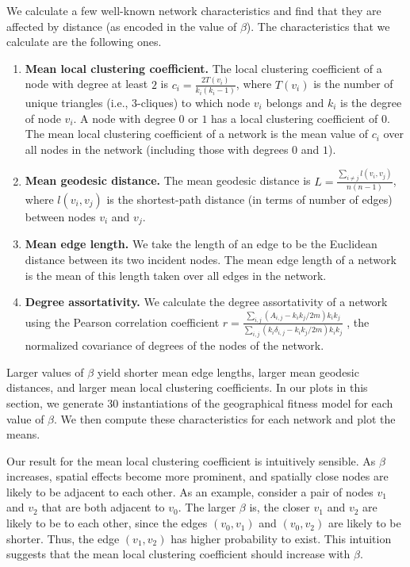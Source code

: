 \documentclass[%
 reprint,
 amsmath,amssymb,
 aps,
]{revtex4-1}
\begin{document}
We calculate a few well-known network characteristics \cite{newman2018} and find that they are affected by distance (as encoded in the value of $\beta$). The characteristics that we calculate are the following ones.
\begin{enumerate}\label{characteristics_definitions}
    \item {\bf Mean local clustering coefficient.} The local clustering coefficient of a node with degree at least $2$ is $c_i = \frac{2T(v_i)}{k_i(k_i - 1)}$, where $T(v_i)$ is the number of unique triangles (i.e., $3$-cliques) to which node $v_i$ belongs and $k_i$ is the degree of node $v_i$. A node with degree $0$ or $1$ has a local clustering coefficient of $0$. The mean local clustering coefficient of a network is the mean value of $c_i$ over all nodes in the network (including those with degrees $0$ and $1$). 
    \item {\bf Mean geodesic distance.} The mean geodesic distance is  $L = \frac{\sum_{i \neq j}l(v_i, v_j)}{n(n-1)}$, where $l(v_i, v_j)$ is the shortest-path distance (in terms of number of edges) between nodes $v_i$ and $v_j$.
    \item {\bf Mean edge length.} We take the length of an edge to be the Euclidean distance between its two incident nodes. The mean edge length of a network is the mean 
    {\color{red}of this length taken} over all edges in the network.
    
    \item {\bf Degree assortativity.} We calculate the degree assortativity of a network using the Pearson correlation coefficient $r = \frac{\sum_{i,j}(A_{i,j}-k_i k_j/2m)k_i k_j}{\sum_{i,j}(k_i \delta_{i,j}-k_i k_j/2m)k_i k_j}$ \cite{newman2018}, the normalized covariance of degrees of the nodes of the network.
\end{enumerate}


Larger values of $\beta$ yield shorter mean edge lengths, larger mean geodesic distances, and larger mean local clustering coefficients. In our plots in this section, {\color{red}we generate 30 instantiations of the geographical fitness model for each value of $\beta$. We then compute these characteristics for each network and plot the means.}

Our result for the mean local clustering coefficient is intuitively sensible. {\color{red}As $\beta$ increases, spatial effects become more prominent, and spatially close nodes are likely to be adjacent to each other. As an example, consider a pair of nodes $v_1$ and $v_2$ that are both adjacent to $v_0$. The larger $\beta$ is, the closer $v_1$ and $v_2$ are likely to be to each other, since the edges $(v_0, v_1)$ and $(v_0, v_2)$ are likely to be shorter. Thus, the edge $(v_1, v_2)$ has higher probability to exist. This intuition suggests that the mean local clustering coefficient should increase with $\beta$.}
\end{document}
